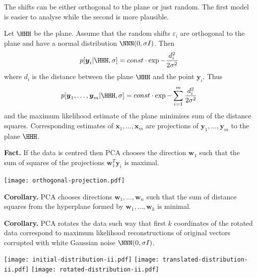 \documentclass[landscape,footrule]{foils}
\renewcommand{\vec}[1]{\boldsymbol{#1}}
\newcommand{\lastline}{\vspace*{-2ex}}
\begin{document}
The shifts can be either orthogonal to the plane or just random. The first model is easier to analyse while the second is more plausible. 



Let $\HHH$ be the plane. Assume that the random shifts $\varepsilon_i$ are orthogonal to the plane and have a normal distribution $\NNN(0,\sigma I)$. Then 
\begin{align*}
p[\vec{y}_i|\HHH,\sigma]=const\cdot\exp{-\frac{d_i^2}{2\sigma^2}}
\end{align*}
where $d_i$ is the distance between the plane $\HHH$ and the point $\vec{y}_i$. Thus
\begin{align*}
p[\vec{y}_1,\ldots,\vec{y}_m|\HHH,\sigma]=const\cdot\exp{-\sum_{i=1}^m\frac{d_i^2}{2\sigma^2}}
\end{align*}
and the maximum likelihood estimate of the plane minimises sum of the distance squares. Corresponding estimates of $\vec{x}_1,\ldots,\vec{x}_m$ are projections of $\vec{y}_1,\ldots,\vec{y}_m$ to the plane $\HHH$.\lastline 


\textbf{Fact.} If the data is centred then PCA chooses the direction $\vec{w}_1$ such that
the sum of squares of the projections $\vec{w}_1^T \vec{y}_i$ is maximal.\vspace*{-1cm}

\begin{center}
\texttt{[image: orthogonal-projection.pdf]}
\end{center}\vspace*{-1cm}


\textbf{Corollary.} PCA chooses directions $\vec{w}_1,\ldots,\vec{w}_n$ such that the sum of distance squares from the hyperplane formed by $\vec{w}_1,\ldots,\vec{w}_k$ is minimal. 


\textbf{Corollary.} PCA rotates the data such way that first $k$ coordinates of the rotated data correspond to maximum likelihood reconstructions of original vectors corrupted with white Gaussian noise $\NNN(0,\sigma I)$.  


\begin{center}
\texttt{[image: initial-distribution-ii.pdf]}
\texttt{[image: translated-distribution-ii.pdf]}
\texttt{[image: rotated-distribution-ii.pdf]}
\end{center}\vspace*{-1cm}
\end{document}

